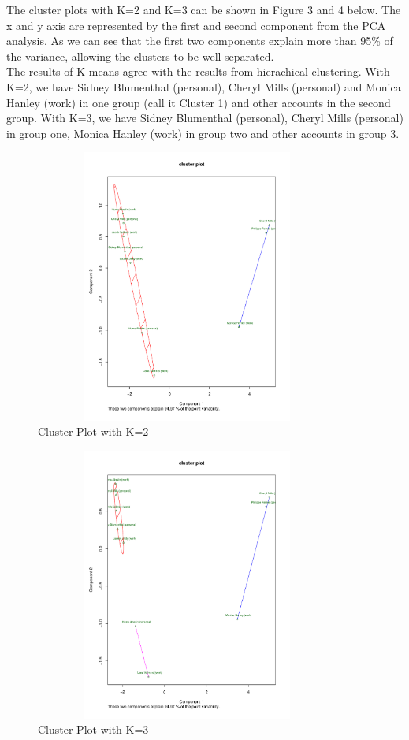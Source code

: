 \documentclass[11pt,a4paper]{article}
\begin{document}
The cluster plots with K=2 and K=3 can be shown in Figure 3 and 4 below. The x and y axis are represented by the first and second component from the PCA analysis. As we can see that the first two components explain more than 95\% of the variance, allowing the clusters to be well separated. 
\\
The results of K-means agree with the results from hierachical clustering. With K=2, we have Sidney Blumenthal (personal), Cheryl Mills (personal) and Monica Hanley (work) in one group (call it Cluster 1) and other accounts in the second group. With K=3, we have Sidney Blumenthal (personal), Cheryl Mills (personal) in group one, Monica Hanley (work) in group two and other accounts in group 3.

\begin{figure}[h!]
    \centering
    \includegraphics[width=10cm,height=9cm]
    {c2.pdf}
    \caption{Cluster Plot with K=2}
\end{figure}

\begin{figure}[h!]
    \centering
    \includegraphics[width=10cm,height=9cm]
    {c3.pdf}
    \caption{Cluster Plot with K=3}
\end{figure}
\end{document}
